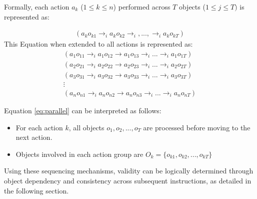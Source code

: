 \documentclass[a4paper,11pt]{lmcs}
\begin{document}
Formally, each action $a_k$ ($1 \leq k \leq n$) performed across $T$ objects ($1 \leq j \leq T)$ is represented as:

\begin{eqnarray}
 \label{eq:parallel_single}
 (a_ko_{k1} \rightarrow_i a_ko_{k2} \rightarrow_i,...,\rightarrow_i a_ko_{kT})
\end{eqnarray}
This Equation when extended to all actions is represented as:
\begin{eqnarray}
\label{eq:parallel}
(a_{1} o_{11} \rightarrow_i a_1 o_{12} \rightarrow a_1 o_{13} \rightarrow_i ... \rightarrow_i a_1 o_{1T}) \\
(a_{2} o_{21} \rightarrow_i a_2 o_{22} \rightarrow a_2 o_{23} \rightarrow_i ... \rightarrow_i a_2 o_{2T}) \nonumber \\
(a_{3} o_{31} \rightarrow_i a_3 o_{32} \rightarrow a_3 o_{33} \rightarrow_i ... \rightarrow_i a_3 o_{3T}) \nonumber \\
\vdots \nonumber \\
(a_{n} o_{n1} \rightarrow_i a_n o_{n2} \rightarrow a_n o_{n3} \rightarrow_i ... \rightarrow_i a_n o_{nT}) \nonumber
\end{eqnarray}

Equation \ref{eq:parallel} can be interpreted as follows:
\begin{itemize}
 \item For each action $k$, all objects $o_1,o_2,...,o_T$ are processed before moving to the next action.
 \item Objects involved in each action group are $O_k = \{o_{k1},o_{k2},...,o_{kT} \}$
\end{itemize}

Using these sequencing mechanisms, validity can be logically determined through object dependency and consistency across subsequent instructions, as detailed in the following section.
\end{document}
